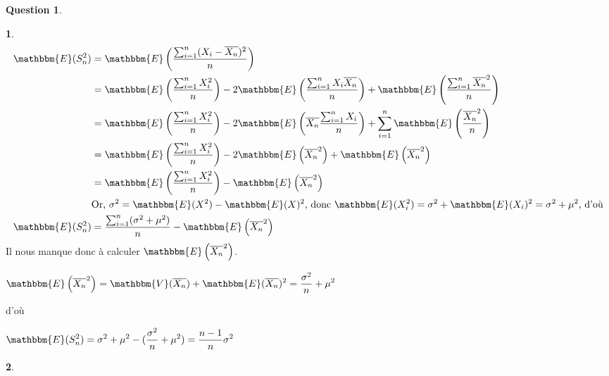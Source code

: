 \documentclass[12pt]{article}
\newcommand{\1}{\mathbbm{1}}
\newcommand{\E}{\mathbbm{E}}
\newcommand{\V}{\mathbbm{V}}
\newcommand{\Xn}{\overline{X_n}}
\theoremstyle{definition}\newtheorem{defn}{Définition}
\theoremstyle{definition}\newtheorem{exm}{Exemple}
\theoremstyle{definition}\newtheorem{rem}{Remarque}
\theoremstyle{definition}\newtheorem{algo}{Algorithme}
\theoremstyle{remark}\newtheorem{exo}{Exercice}
\theoremstyle{remark}\newtheorem{nota}{Notation}
\theoremstyle{definition}\newtheorem{1q}{Question}
\theoremstyle{definition}\newtheorem{2q}{Question}
\theoremstyle{definition}\newtheorem{3q}{Question}
\theoremstyle{definition}\newtheorem{4q}{Question}
\theoremstyle{definition}\newtheorem{2qs1}{}
\theoremstyle{definition}\newtheorem{2qs2}{}
\theoremstyle{definition}\newtheorem{2qs3}{}
\theoremstyle{definition}\newtheorem{2qs4}{}
\theoremstyle{definition}\newtheorem{4qs2}{}
\theoremstyle{definition}\newtheorem{4qs3}{}
\begin{document}
\begin{4q}
\begin{4qs3}
\begin{align*}
\E(S_n^2) &= \E\left(\displaystyle\frac{\sum_{i=1}^n(X_i -\Xn)^2}{n}\right)\\
&= \E\left(\displaystyle\frac{\sum_{i=1}^n X_i^2}{n}\right) -2 \E\left(\displaystyle\frac{\sum_{i=1}^n X_i \Xn}{n}\right) +\E\left(\displaystyle\frac{\sum_{i=1}^n \Xn^2}{n}\right) \\
&= \E\left(\displaystyle\frac{\sum_{i=1}^n X_i^2}{n}\right) -2 \E\left(\displaystyle\Xn\frac{\sum_{i=1}^n X_i}{n}\right) +\sum_{i=1}^n\E \left(\displaystyle\frac{\Xn^2}{n}\right) \\
&= \E\left(\displaystyle\frac{\sum_{i=1}^n X_i^2}{n}\right) -2 \E\left(\displaystyle\Xn^2\right) +\E\left(\Xn^2\right) \\
&= \E\left(\displaystyle\frac{\sum_{i=1}^n X_i^2}{n}\right) -\E\left(\displaystyle\Xn^2\right)\\
& \text{Or, $\sigma^2 = \E(X^2)-\E(X)^2$, donc $\E(X_i^2) = \sigma^2+\E(X_i)^2 = \sigma^2+\mu^2$, d'où}\\
\E(S_n^2) &= \displaystyle\frac{\sum_{i=1}^n (\sigma^2+\mu^2)}{n}-\E\left(\displaystyle\Xn^2\right)\\
\end{align*}
Il nous manque donc à calculer $\E\left(\displaystyle\Xn^2\right)$. 
\begin{center} $\displaystyle\E\left(\Xn^2\right) = \V(\Xn) + \E(\Xn)^2 = \frac{\sigma^2}{n} + \mu^2$ \end{center}
d'où
\begin{center}$\displaystyle \E(S_n^2) = \sigma^2+\mu^2 - (\frac{\sigma^2}{n} + \mu^2) = \frac{n-1}{n}\sigma^2$\end{center}
\end{4qs3}

\begin{4qs3}
\end{4qs3}


\end{4q}
\end{document}
